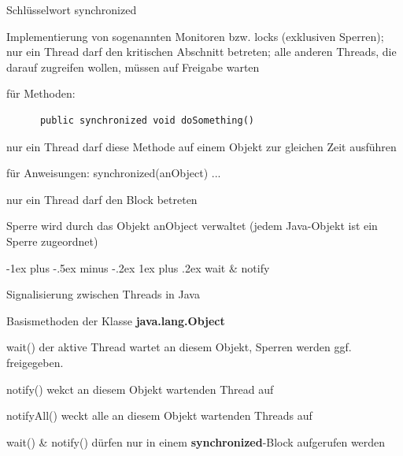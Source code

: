 \documentclass[10pt]{article}
\makeatletter
\renewcommand{\subsubsection}{\@startsection{subsubsection}{3}{0mm}%
                                {-1ex plus -.5ex minus -.2ex}%
                                {1ex plus .2ex}%
                                {\normalfont\small\bfseries}}
\makeatother
\begin{document}
  \begin{itemize*}
    \item Schlüsselwort synchronized
    \begin{itemize*}
      \item Implementierung von sogenannten Monitoren bzw. locks (exklusiven Sperren); nur ein Thread darf den kritischen Abschnitt betreten; alle anderen Threads, die darauf zugreifen wollen, müssen auf Freigabe warten
      \item für Methoden:
      \begin{lstlisting}
      public synchronized void doSomething()
  \end{lstlisting}
      \begin{itemize*}
        \item nur ein Thread darf diese Methode auf einem Objekt zur gleichen Zeit ausführen
      \end{itemize*}
      \item für Anweisungen: synchronized(anObject) { ... }
      \begin{itemize*}
        \item nur ein Thread darf den Block betreten
        \item Sperre wird durch das Objekt anObject verwaltet (jedem Java-Objekt ist ein Sperre zugeordnet)
      \end{itemize*}
    \end{itemize*}
  \end{itemize*}
  
  \subsubsection{wait \& notify}
  \begin{description*}
    \item[] Signalisierung zwischen Threads in Java
    \item[] Basismethoden der Klasse \textbf{java.lang.Object}
    \item[wait()] der aktive Thread wartet an diesem Objekt, Sperren werden ggf. freigegeben.
    \item[notify()] wekct an diesem Objekt wartenden Thread auf
    \item[notifyAll()] weckt alle an diesem Objekt wartenden Threads auf
    \item[wait() \& notify()] dürfen nur in einem \textbf{synchronized}-Block aufgerufen werden
  \end{description*}
  
\end{document}
